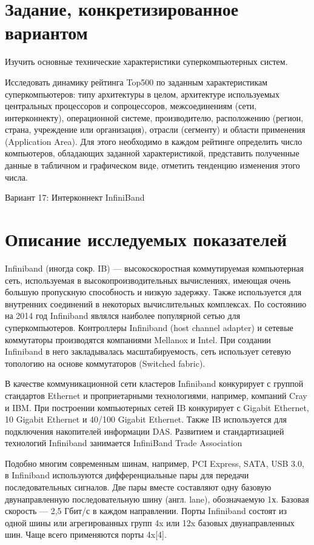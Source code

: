 \documentclass[14pt,a4paper]{extarticle}
\begin{document}
\section{Задание, конкретизированное вариантом}
\begin{sloppypar}
Изучить основные технические характеристики суперкомпьютерных систем.

Исследовать динамику рейтинга Top500 по заданным характеристикам
суперкомпьютеров: типу архитектуры в целом, архитектуре используемых
центральных процессоров и сопроцессоров, межсоединениям (сети, интерконнекту),
операционной системе, производителю, расположению (регион, страна, учреждение
или организация), отрасли (сегменту) и области применения
(Application Area). Для этого необходимо в каждом рейтинге определить
число компьютеров, обладающих заданной характеристикой, представить полученные
данные в табличном и графическом виде, отметить тенденцию изменения этого
числа.
\end{sloppypar}

Вариант 17: Интерконнект InfiniBand

\newpage
\section{Описание исследуемых показателей}
Infiniband (иногда сокр. IB) — высокоскоростная коммутируемая компьютерная
    сеть, используемая в высокопроизводительных вычислениях, имеющая очень
    большую пропускную способность и низкую задержку. Также используется для
    внутренних соединений в некоторых вычислительных комплексах. По состоянию
    на 2014 год Infiniband являлся наиболее популярной сетью для
    суперкомпьютеров. Контроллеры Infiniband (host channel adapter) и сетевые
    коммутаторы производятся компаниями Mellanox и Intel. При создании
    Infiniband в него закладывалась масштабируемость, сеть использует сетевую
    топологию на основе коммутаторов (Switched fabric).

    В качестве коммуникационной сети кластеров Infiniband конкурирует с группой
    стандартов Ethernet и проприетарными технологиями, например, компаний
    Cray и IBM. При построении компьютерных сетей IB конкурирует с Gigabit
    Ethernet, 10 Gigabit Ethernet и 40/100 Gigabit Ethernet. Также IB
    используется для подключения накопителей информации DAS. Развитием и
    стандартизацией технологий Infiniband занимается InfiniBand Trade
    Association

\sloppy
Подобно многим современным шинам, например, PCI Express, SATA, USB 3.0, в
Infiniband используются дифференциальные пары для передачи последовательных
сигналов. Две пары вместе составляют одну базовую двунаправленную
последовательную шину (англ. lane), обозначаемую 1х. Базовая скорость — 2,5
Гбит/с в каждом направлении. Порты Infiniband состоят из одной шины или
агрегированных групп 4x или 12x базовых двунаправленных шин. Чаще всего
применяются порты 4x[4].
\end{document}

